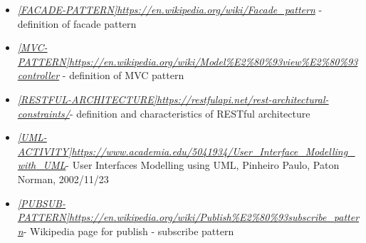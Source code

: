 \documentclass[a4paper]{report}
\begin{document}
\begin{itemize}
\item \label{ref:facade-pattern} \hyperref[use:facade-pattern]{\textit{[FACADE-PATTERN]}}\href{https://en.wikipedia.org/wiki/Facade\_pattern}{\textit{https://en.wikipedia.org/wiki/Facade\_pattern}} - definition of facade pattern
\item \label{ref:MVC-pattern} \hyperref[use:MVC-pattern]{\textit{[MVC-PATTERN]}}\href{https://en.wikipedia.org/wiki/Model\%E2\%80\%93view\%E2\%80\%93controller}{\textit{https://en.wikipedia.org/wiki/Model\%E2\%80\%93view\%E2\%80\%93controller}} - definition of MVC pattern
\item \label{ref:RESTful-architecture} \hyperref[use:RESTful-architecture]{\textit{[RESTFUL-ARCHITECTURE]}}\href{https://restfulapi.net/rest-architectural-constraints/}{\textit{https://restfulapi.net/rest-architectural-constraints/}}- definition and characteristics of RESTful architecture
\item \label{ref:UML-Activity} \hyperref[use:UML-Activity]{\textit{[UML-ACTIVITY]}}\href{https://www.academia.edu/5041934/User\_Interface\_Modelling\_with\_UML}{\textit{https://www.academia.edu/5041934/User\_Interface\_Modelling\_with\_UML}}- User Interfaces Modelling using UML, Pinheiro Paulo, Paton Norman, 2002/11/23
\item \label{ref:pubsub-pattern} \hyperref[use:pubsub-pattern]{\textit{[PUBSUB-PATTERN]}}\href{https://en.wikipedia.org/wiki/Publish\%E2\%80\%93subscribe\_pattern}{\textit{https://en.wikipedia.org/wiki/Publish\%E2\%80\%93subscribe\_pattern}}- Wikipedia page for publish - subscribe pattern
\end{itemize}
\end{document}
